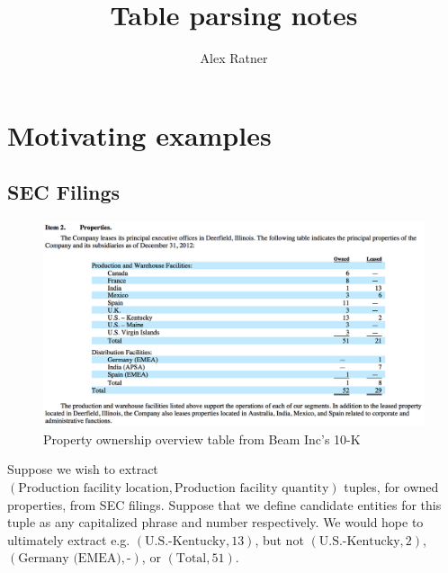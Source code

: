 \documentclass[11pt]{article} %
\title{Table parsing notes}
\author{Alex Ratner}
\begin{document}
\maketitle




\section{Motivating examples}

\subsection{SEC Filings}
\begin{figure}[h]
    \centering
    \includegraphics[width=1.0\textwidth]{sec_table_1.png}
    \caption{Property ownership overview table from Beam Inc's 10-K}
    \label{fig:sec_table_1}
\end{figure}

Suppose we wish to extract $(\text{Production facility location}, \text{Production facility quantity})$ tuples, for owned properties, from SEC filings.  Suppose that we define candidate entities for this tuple as any capitalized phrase and number respectively.  We would hope to ultimately extract e.g. $(\text{U.S.-Kentucky}, 13)$, but not $(\text{U.S.-Kentucky}, 2)$, $(\text{Germany (EMEA)}, \text{-})$, or $(\text{Total}, 51)$.
\end{document}
